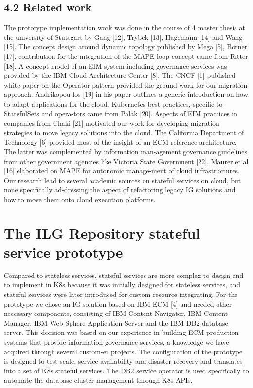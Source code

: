 \documentclass[runningheads]{llncs}
\begin{document}
\subsection{4.2	Related work}
The prototype implementation work was done in the course of 4 master thesis at the university of Stuttgart by Gang [12], Trybek [13], Hagemann [14] and Wang [15]. The concept design around dynamic topology published by Mega [5], Börner [17], contribution for the integration of the MAPE loop concept came from Ritter [18]. A concept model of an EIM system including governance services was provided by the IBM Cloud Architecture Center [8]. The CNCF [1] published white paper on the Operator pattern provided the ground work for our migration approach. Andrikopou-los [19] in his paper outlines a generic introduction on how to adapt applications for the cloud. Kubernetes best practices, specific to StatefulSets and opera-tors came from Palak [20]. Aspects of EIM practices in companies from Chaki [21] motivated our work for developing migration strategies to move legacy solutions into the cloud. The California Department of Technology [6] provided most of the insight of an ECM reference architecture. The latter was complemented by information man-agement governance guidelines from other government agencies like Victoria State Government [22]. Maurer et al [16] elaborated on MAPE for autonomic manage-ment of cloud infrastructures. Our research lead to several academic sources on stateful services on cloud, but none specifically ad-dressing the aspect of refactoring legacy IG solutions and how to move them onto cloud execution platforms.

\section{The ILG Repository stateful service prototype}
Compared to stateless services, stateful services are more complex to design and to implement in K8s because it was initially designed for stateless services, and stateful services were later introduced for custom resource integrating. For the prototype we chose an IG solution based on IBM ECM [4] and needed other necessary components, consisting of IBM Content Navigator, IBM Content Manager, IBM Web-Sphere Application Server and the IBM DB2 database server. This decision was based on our experience in building ECM production systems that provide information governance services, a knowledge we have acquired through several custom-er projects. The configuration of the prototype is designed to test scale, service availability and disaster recovery and translates into a set of K8s stateful services. The DB2 service operator is used specifically to automate the database cluster management through K8s APIs.
\end{document}
